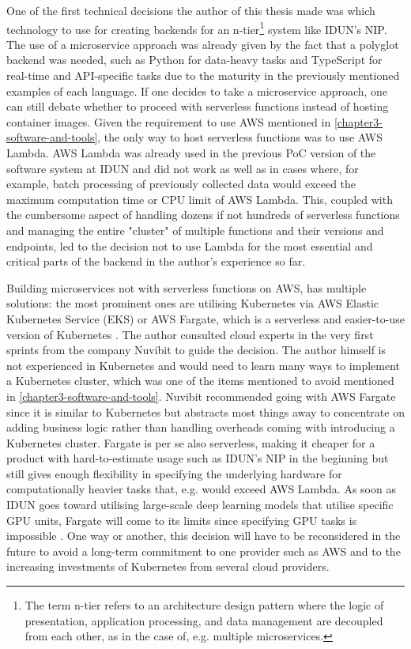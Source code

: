 One of the first technical decisions the author of this thesis made was which technology to use for creating backends for an n-tier\footnote{The term n-tier refers to an architecture design pattern where the logic of presentation, application processing, and data management are decoupled from each other, as in the case of, e.g. multiple microservices.} system like IDUN's NIP. The use of a microservice approach was already given by the fact that a polyglot backend was needed, such as Python for data-heavy tasks and TypeScript for real-time and API-specific tasks due to the maturity in the previously mentioned examples of each language. If one decides to take a microservice approach, one can still debate whether to proceed with serverless functions instead of hosting container images. Given the requirement to use AWS mentioned in \autoref{chapter3-software-and-tools}, the only way to host serverless functions was to use AWS Lambda. AWS Lambda was already used in the previous PoC version of the software system at IDUN and did not work as well as in cases where, for example, batch processing of previously collected data would exceed the maximum computation time or CPU limit of AWS Lambda. This, coupled with the cumbersome aspect of handling dozens if not hundreds of serverless functions and managing the entire "cluster" of multiple functions and their versions and endpoints, led to the decision not to use Lambda for the most essential and critical parts of the backend in the author's experience so far.

Building microservices not with serverless functions on AWS, has multiple solutions: the most prominent ones are utilising Kubernetes via AWS Elastic Kubernetes Service (EKS) or AWS Fargate, which is a serverless and easier-to-use version of Kubernetes \citep{amazon_web_services_inc_serverless_nodate}. The author consulted cloud experts in the very first sprints from the company Nuvibit to guide the decision. The author himself is not experienced in Kubernetes and would need to learn many ways to implement a Kubernetes cluster, which was one of the items mentioned to avoid mentioned in \autoref{chapter3-software-and-tools}. Nuvibit recommended going with AWS Fargate since it is similar to Kubernetes but abstracts most things away to concentrate on adding business logic rather than handling overheads coming with introducing a Kubernetes cluster. Fargate is per se also serverless, making it cheaper for a product with hard-to-estimate usage such as IDUN's NIP in the beginning but still gives enough flexibility in specifying the underlying hardware for computationally heavier tasks that, e.g. would exceed AWS Lambda. As soon as IDUN goes toward utilising large-scale deep learning models that utilise specific GPU units, Fargate will come to its limits since specifying GPU tasks is impossible \citep{aws_aws_2019}. One way or another, this decision will have to be reconsidered in the future to avoid a long-term commitment to one provider such as AWS and to the increasing investments of Kubernetes from several cloud providers.


